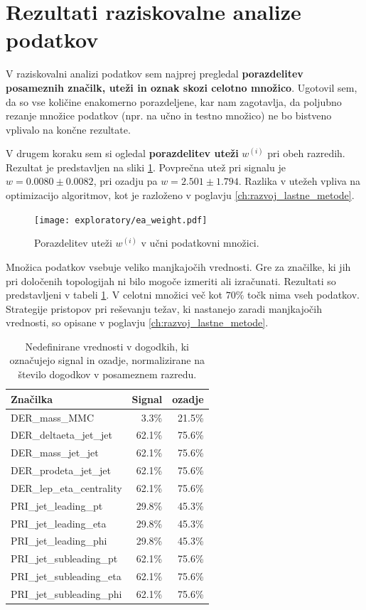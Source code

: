 \documentclass[11pt,a4paper,openany]{book}
\begin{document}
\section{Rezultati raziskovalne analize podatkov}
\label{sec:raziskovalna-analiza}

V raziskovalni analizi podatkov sem najprej pregledal \textbf{porazdelitev posameznih značilk, uteži in oznak skozi celotno množico}. Ugotovil sem, da so vse količine enakomerno porazdeljene, kar nam zagotavlja, da poljubno rezanje množice podatkov (npr. na učno in testno množico) ne bo bistveno vplivalo na končne rezultate.

V drugem koraku sem si ogledal \textbf{porazdelitev uteži} $w^{(i)}$ pri obeh razredih. Rezultat je predstavljen na sliki \ref{sl:weight}. Povprečna utež pri signalu je $w = 0.0080 \pm 0.0082$, pri ozadju pa $w = 2.501 \pm 1.794$. Razlika v utežeh vpliva na optimizacijo algoritmov, kot je razloženo v poglavju \ref{ch:razvoj_lastne_metode}.

\begin{figure}[ht]
	\centering
	\texttt{[image: exploratory/ea\_weight.pdf]} 
	\caption{Porazdelitev uteži $w^{(i)}$ v učni podatkovni množici.}
	\label{sl:weight}		
\end{figure}

Množica podatkov vsebuje veliko manjkajočih vrednosti. Gre za značilke, ki jih pri določenih topologijah ni bilo mogoče izmeriti ali izračunati. Rezultati so predstavljeni v tabeli \ref{tb:manjkajoce_vrednosti}. V celotni množici več kot $70\%$ točk nima vseh podatkov. Strategije pristopov pri reševanju težav, ki nastanejo zaradi manjkajočih vrednosti, so opisane v poglavju \ref{ch:razvoj_lastne_metode}.

\begin{table}[ht]
	\centering
	\begin{tabular}{lrr}
		\hline
		\textbf{Značilka} &         \textbf{Signal} &         \textbf{ozadje} \\
		\hline
		DER\_mass\_MMC            &  3.3\%  &  21.5\% \\
		DER\_deltaeta\_jet\_jet   &  62.1\% &  75.6\% \\
		DER\_mass\_jet\_jet       &  62.1\% &  75.6\% \\
		DER\_prodeta\_jet\_jet    &  62.1\% &  75.6\% \\
		DER\_lep\_eta\_centrality &  62.1\% &  75.6\% \\
		PRI\_jet\_leading\_pt     &  29.8\% &  45.3\% \\
		PRI\_jet\_leading\_eta    &  29.8\% &  45.3\% \\
		PRI\_jet\_leading\_phi    &  29.8\% &  45.3\% \\
		PRI\_jet\_subleading\_pt  &  62.1\% &  75.6\% \\
		PRI\_jet\_subleading\_eta &  62.1\% &  75.6\% \\
		PRI\_jet\_subleading\_phi &  62.1\% &  75.6\% \\
	\end{tabular}
	\caption{Nedefinirane vrednosti v dogodkih, ki označujejo signal in ozadje, normalizirane na število dogodkov v posameznem razredu.}
	\label{tb:manjkajoce_vrednosti}
\end{table}
\end{document}
